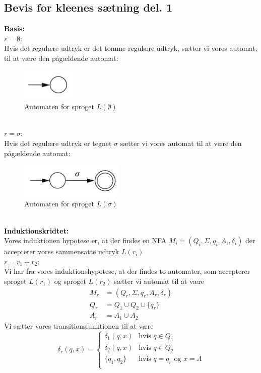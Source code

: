 \documentclass[a4, danish]{article}
\begin{document}
   \subsection{Bevis for kleenes sætning del. 1}
    \textbf{Basis:}\\
    $r=\emptyset$: \\
    Hvis det regulære udtryk er det tomme regulære udtryk, sætter vi vores automat, til at være den pågældende automat: \\
    \begin{figure}[h]
    	  \centering
    	  \includegraphics[width=25mm]{img/Kleene11.png}
    	  \caption{Automaten for sproget $L(\emptyset)$	\label{KleeneBasis1}}
    \end{figure}
    \\
    $r=\sigma$:\\
    Hvis det regulære udtryk er tegnet $\sigma$ sætter vi vores automat til at være den pågældende automat:
    \begin{figure}[ht!]
  	  \centering
      \includegraphics[width=50mm]{img/Kleene12.png}
  	  \caption{Automaten for sproget $L(\sigma)$	\label{KleeneBasis2}}
    \end{figure}
    \\
    \textbf{Induktionskridtet:} \\
    Vores induktionen hypotese er, at der findes en NFA $M_i=(Q_i,\Sigma,q_i,A_i,\delta_i)$ der accepterer vores sammensatte udtryk $L(r_i)$ \\
    $r=r_1+r_2$: \\
    Vi har fra vores induktionshypotese, at der findes to automater, som accepterer sproget $L(r_1)$ og sproget $L(r_2)$ sætter vi automat til at være
    \begin{align*}
      M_r&=(Q_r,\Sigma,q_r,A_r,\delta_r) \\
      Q_r&=Q_1\cup Q_2 \cup \{q_r\} \\
      A_r&=A_1\cup A_2 
    \end{align*}
    Vi sætter vores transitionsfunktionen til at være 
    \begin{equation*}
		  \delta_r(q,x) =
  		\begin{cases}
  			\mbox{$\delta_1(q,x)$} & \mbox{hvis $q\in Q_1$} \\
  			\mbox{$\delta_2(q,x)$} & \mbox{hvis $q\in Q_2$} \\
   			\mbox{$\{q_1, q_2\}$} & \mbox{hvis $q=q_r$  og $x=\Lambda$} \\
  		\end{cases}
		\end{equation*}
\end{document}
